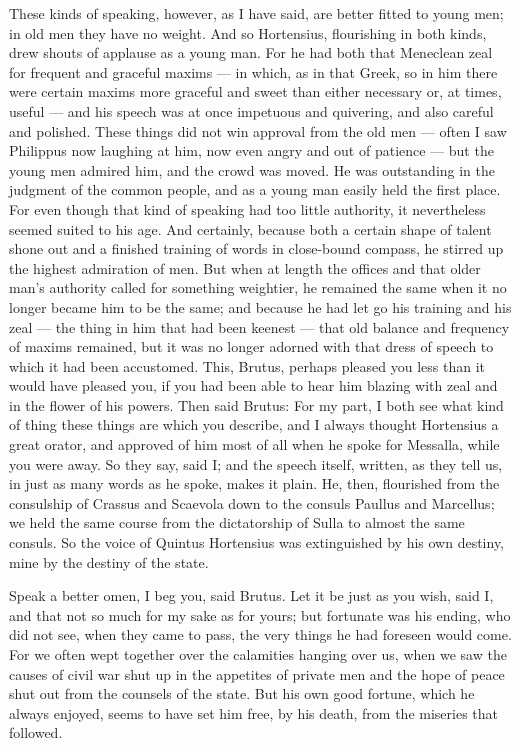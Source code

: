  These kinds of speaking, however, as I have said, are better fitted to young men; in old men they have no weight. And so Hortensius, flourishing in both kinds, drew shouts of applause as a young man. For he had both that Meneclean zeal for frequent and graceful maxims — in which, as in that Greek, so in him there were certain maxims more graceful and sweet than either necessary or, at times, useful — and his speech was at once impetuous and quivering, and also careful and polished. These things did not win approval from the old men — often I saw Philippus now laughing at him, now even angry and out of patience — but the young men admired him, and the crowd was moved. He was outstanding in the judgment of the common people, and as a young man easily held the first place. For even though that kind of speaking had too little authority, it nevertheless seemed suited to his age. And certainly, because both a certain shape of talent shone out and a finished training of words in close-bound compass, he stirred up the highest admiration of men. But when at length the offices and that older man's authority called for something weightier, he remained the same when it no longer became him to be the same; and because he had let go his training and his zeal — the thing in him that had been keenest — that old balance and frequency of maxims remained, but it was no longer adorned with that dress of speech to which it had been accustomed. This, Brutus, perhaps pleased you less than it would have pleased you, if you had been able to hear him blazing with zeal and in the flower of his powers. Then said Brutus: For my part, I both see what kind of thing these things are which you describe, and I always thought Hortensius a great orator, and approved of him most of all when he spoke for Messalla, while you were away. So they say, said I; and the speech itself, written, as they tell us, in just as many words as he spoke, makes it plain. He, then, flourished from the consulship of Crassus and Scaevola down to the consuls Paullus and Marcellus; we held the same course from the dictatorship of Sulla to almost the same consuls. So the voice of Quintus Hortensius was extinguished by his own destiny, mine by the destiny of the state.

 Speak a better omen, I beg you, said Brutus. Let it be just as you wish, said I, and that not so much for my sake as for yours; but fortunate was his ending, who did not see, when they came to pass, the very things he had foreseen would come. For we often wept together over the calamities hanging over us, when we saw the causes of civil war shut up in the appetites of private men and the hope of peace shut out from the counsels of the state. But his own good fortune, which he always enjoyed, seems to have set him free, by his death, from the miseries that followed.

